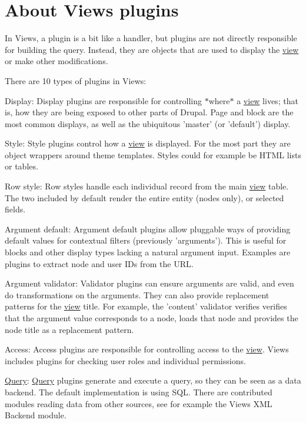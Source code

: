 \hypertarget{group__views__plugins}{
\section{About Views plugins}
\label{group__views__plugins}
}
In Views, a plugin is a bit like a handler, but plugins are not directly responsible for building the query. Instead, they are objects that are used to display the \hyperlink{classview}{view} or make other modifications.

There are 10 types of plugins in Views:
\begin{DoxyItemize}
\item Display: Display plugins are responsible for controlling $\ast$where$\ast$ a \hyperlink{classview}{view} lives; that is, how they are being exposed to other parts of Drupal. Page and block are the most common displays, as well as the ubiquitous 'master' (or 'default') display.
\item Style: Style plugins control how a \hyperlink{classview}{view} is displayed. For the most part they are object wrappers around theme templates. Styles could for example be HTML lists or tables.
\item Row style: Row styles handle each individual record from the main \hyperlink{classview}{view} table. The two included by default render the entire entity (nodes only), or selected fields.
\item Argument default: Argument default plugins allow pluggable ways of providing default values for contextual filters (previously 'arguments'). This is useful for blocks and other display types lacking a natural argument input. Examples are plugins to extract node and user IDs from the URL.
\item Argument validator: Validator plugins can ensure arguments are valid, and even do transformations on the arguments. They can also provide replacement patterns for the \hyperlink{classview}{view} title. For example, the 'content' validator verifies verifies that the argument value corresponds to a node, loads that node and provides the node title as a replacement pattern.
\item Access: Access plugins are responsible for controlling access to the \hyperlink{classview}{view}. Views includes plugins for checking user roles and individual permissions.
\item \hyperlink{classQuery}{Query}: \hyperlink{classQuery}{Query} plugins generate and execute a query, so they can be seen as a data backend. The default implementation is using SQL. There are contributed modules reading data from other sources, see for example the Views XML Backend module.

\end{DoxyItemize}
